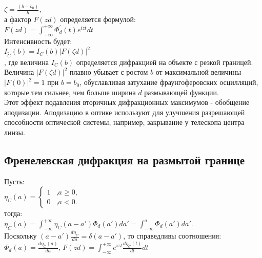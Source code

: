 \documentclass[11pt]{report}
\begin{document}
  $\zeta = \frac{(b-b_0)}{\hbar}$, \\
 
 а фактор $F(zd)$ определяется формулой: \\

$F(zd)=\int_{-∞}^{+∞} \Phi_d^{'}(t)e^{izt}dt $\\

Интенсивность будет: \\

$I_{\tilde C}(b) =I_C(b)|F(\zeta d)|^2$ \\

, где величина $I_C(b)$ определяется дифракцией на объекте с резкой границей. \\

Величина $|F(\zeta d)|^2$ плавно убывает с ростом $b$ от максимальной величины $|F(0)|^2 = 1$ при $b=b_0$, обуславливая затухание фраунгоферовских осцилляций, которые тем сильнее, чем больше ширина $d$ размывающей функции. \\

Этот эффект подавления вторичных дифракционных максимумов - обобщение аподизации. Аподизацию в оптике используют для улучшения разрешающей способности оптической системы, например, закрывание у телескопа центра линзы. \\

\subsection{Френелевская дифракция на размытой границе}
Пусть: \\

$
\eta_C(a) =
\left\{
\begin{array}{lr}
1 & \text{,} a \geq 0, \\
0 & \text{,} a < 0 .
\end{array}
\right.
$ \\

тогда: \\

$\eta_{\tilde C}(a) = \int_{-∞}^{+∞} \eta_C(a-a') \Phi_d(a')da' = \int_{-∞}^{a} \Phi_d(a')da' $.\\

Поскольку $(a-a')\frac{d\eta_C}{da} = \delta(a-a')$, то справедливы соотношения:\\

$\Phi_d(a) = \frac{d\eta_{\tilde C}(a)}{da}$, $F(zd)=\int_{-∞}^{+∞} e^{izt}\frac{d\eta_{\tilde C}(t)}{dt}dt $\\
\end{document}

